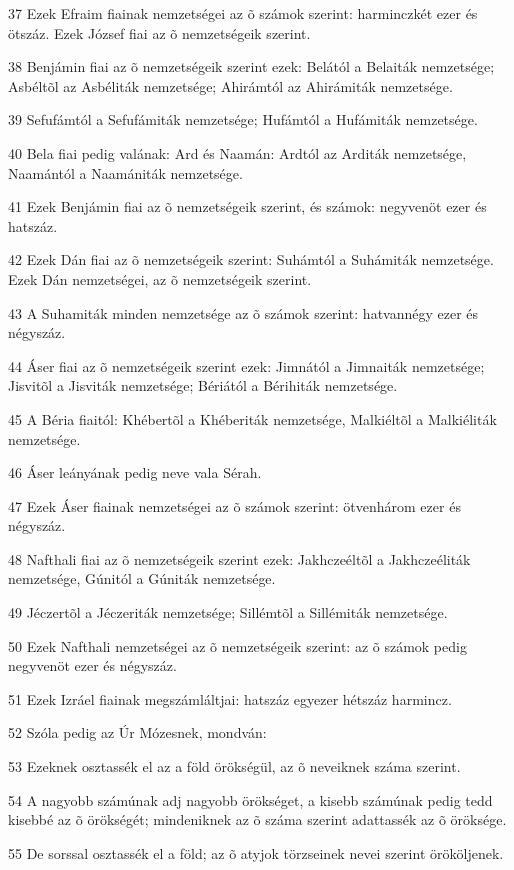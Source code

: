 \par 37 Ezek Efraim fiainak nemzetségei az õ számok szerint: harminczkét ezer és ötszáz. Ezek József fiai az õ nemzetségeik szerint.
\par 38 Benjámin fiai az õ nemzetségeik szerint ezek: Belától a Belaiták nemzetsége; Asbéltõl az Asbéliták nemzetsége; Ahirámtól az Ahirámiták nemzetsége.
\par 39 Sefufámtól a Sefufámiták nemzetsége; Hufámtól a Hufámiták nemzetsége.
\par 40 Bela fiai pedig valának: Ard és Naamán: Ardtól az Arditák nemzetsége, Naamántól a Naamániták nemzetsége.
\par 41 Ezek Benjámin fiai az õ nemzetségeik szerint, és számok: negyvenöt ezer és hatszáz.
\par 42 Ezek Dán fiai az õ nemzetségeik szerint: Suhámtól a Suhámiták nemzetsége. Ezek Dán nemzetségei, az õ nemzetségeik szerint.
\par 43 A Suhamiták minden nemzetsége az õ számok szerint: hatvannégy ezer és négyszáz.
\par 44 Áser fiai az õ nemzetségeik szerint ezek: Jimnától a Jimnaiták nemzetsége; Jisvitõl a Jisviták nemzetsége; Bériától a Bérihiták nemzetsége.
\par 45 A Béria fiaitól: Khébertõl a Khéberiták nemzetsége, Malkiéltõl a Malkiéliták nemzetsége.
\par 46 Áser leányának pedig neve vala Sérah.
\par 47 Ezek Áser fiainak nemzetségei az õ számok szerint: ötvenhárom ezer és négyszáz.
\par 48 Nafthali fiai az õ nemzetségeik szerint ezek: Jakhczeéltõl a Jakhczeéliták nemzetsége, Gúnitól a Gúniták nemzetsége.
\par 49 Jéczertõl a Jéczeriták nemzetsége; Sillémtõl a Sillémiták nemzetsége.
\par 50 Ezek Nafthali nemzetségei az õ nemzetségeik szerint: az õ számok pedig negyvenöt ezer és négyszáz.
\par 51 Ezek Izráel fiainak megszámláltjai: hatszáz egyezer hétszáz harmincz.
\par 52 Szóla pedig az Úr Mózesnek, mondván:
\par 53 Ezeknek osztassék el az a föld örökségül, az õ neveiknek száma szerint.
\par 54 A nagyobb számúnak adj nagyobb örökséget, a kisebb számúnak pedig tedd kisebbé az õ örökségét; mindeniknek az õ száma szerint adattassék az õ öröksége.
\par 55 De sorssal osztassék el a föld; az õ atyjok törzseinek nevei szerint örököljenek.
